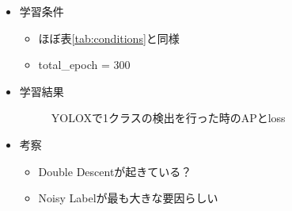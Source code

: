\documentclass[a4j]{ujarticle}
\newcommand{\Tref}[1]{\mbox{表\ref{tab:#1}}}
\begin{document}
\begin{itemize}
\begin{itemize}
                    \item 学習条件
                    \begin{itemize}
                        \item ほぼ\Tref{conditions}と同様
                        \item total\_epoch = 300
                    \end{itemize}
                    \item 学習結果
                    \begin{figure}[h]
                        \centering
                        \caption{YOLOXで1クラスの検出を行った時のAPとloss}
                    \end{figure}
                \end{itemize}
                \begin{itemize}
                    \item 考察
                    \begin{itemize}
                        \item Double Descentが起きている？
                        \item Noisy Labelが最も大きな要因らしい
                    \end{itemize}
                \end{itemize}

\clearpage


\end{itemize}
\end{document}
